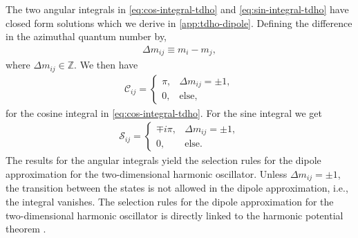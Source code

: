             The two angular integrals in \autoref{eq:cos-integral-tdho} and
            \autoref{eq:sin-integral-tdho} have closed form solutions which we
            derive in \autoref{app:tdho-dipole}.
            Defining the difference in the azimuthal quantum number by,
            \begin{align}
                \Delta m_{ij} \equiv m_i - m_j,
                \label{eq:diff-m-tdqd}
            \end{align}
            where $\Delta m_{ij} \in \mathbb{Z}$.
            We then have
            \begin{align}
                \mathcal{C}_{ij}
                = \begin{cases}
                    \pi, & \Delta m_{ij} = \pm 1, \\
                    0, & \text{else},
                \end{cases}
            \end{align}
            for the cosine integral in \autoref{eq:cos-integral-tdho}.
            For the sine integral we get
            \begin{align}
                \mathcal{S}_{ij}
                = \begin{cases}
                    \mp i\pi, & \Delta m_{ij} = \pm 1, \\
                    0, & \text{else}.
                \end{cases}
            \end{align}
            The results for the angular integrals yield the selection rules for
            the dipole approximation for the two-dimensional harmonic
            oscillator.
            Unless $\Delta m_{ij} = \pm 1$, the transition between the states is
            not allowed in the dipole approximation, i.e., the integral
            vanishes.
            The selection rules for the dipole approximation for the
            two-dimensional harmonic oscillator is directly linked to the
            harmonic potential theorem \cite{kohn, brey}.


